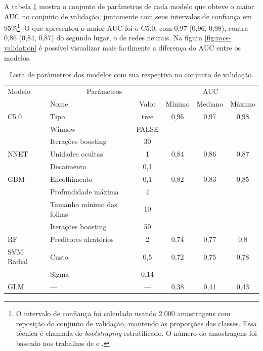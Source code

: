 \documentclass[a4paper,titlepage]{ppgi}\usepackage[]{graphicx}\usepackage[]{color}
\begin{document}
A tabela \ref{table:resultados-validacao} mostra o conjunto de parâmetros de
cada modelo que obteve o maior \gls{AUC} no conjunto de validação, juntamente com seus
intervalos de confiança em 95\%\footnote{O intervalo de confiança foi
calculado usando 2.000 amostragens com reposição do conjunto de validação,
mantendo as proporções das classes. Essa técnica é chamada de
\emph{bootstraping} estratificado. O número de amostragens foi baseado nos
trabalhos de  e .}. O que
apresentou o maior \gls{AUC} foi o C5.0, com 0,97
(0,96, 0,98),
contra 0,86
(0,84, 0,87)
do segundo lugar, o de redes neurais. Na figura \ref{fig:rocs-validation} é
possível visualizar mais facilmente a diferença do \gls{AUC} entre os modelos.

\begin{table}
\centering
\begin{tabular}{l l c c c c}
  Modelo & \multicolumn{2}{c}{Parâmetros} & \multicolumn{3}{c}{AUC} \\ \cline{2-6}
  & \multicolumn{1}{|l}{Nome} & \multicolumn{1}{c|}{Valor} & Mínimo & Mediano & \multicolumn{1}{c|}{Máximo} \\
  \hline
  C5.0 & Tipo & tree & 0,96&0,97&0,98 \\
       & Winnow & FALSE & & & \\
       & Iterações boosting & 30 & & & \\
  NNET & Unidades ocultas & 1 & 0,84&0,86&0,87 \\
       & Decaimento & 0,1 & & & \\
  GBM & Encolhimento & 0,1 & 0,82&0,83&0,85 \\
      & Profundidade máxima & 4 & & & \\
      & Tamanho mínimo das folhas & 10 & & & \\
      & Iterações boosting & 50 & & & \\
  RF & Preditores aleatórios & 2 & 0,74&0,77&0,8 \\
  SVM Radial & Custo & 0,5 & 0,72&0,75&0,78 \\
             & Sigma & 0,14 & & & \\
  GLM & --- & --- & 0,38&0,41&0,43 \\
\end{tabular}
\caption{Lista de parâmetros dos modelos com sua respectiva 
no conjunto de validação.}
\label{table:resultados-validacao}
\end{table}
\end{document}
